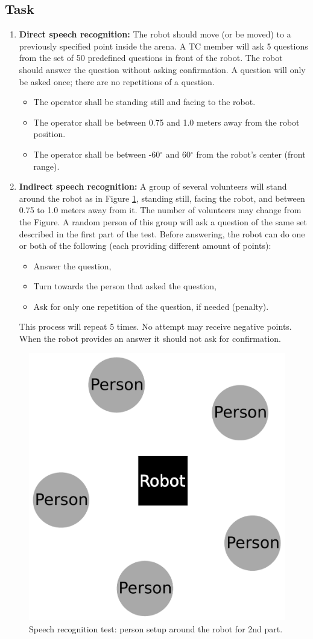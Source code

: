\subsection{Task}

\begin{enumerate}
\item \textbf{Direct speech recognition: } The robot should move (or be moved) to a previously specified point inside the arena. 
  A TC member will ask 5 questions from the set of 50 predefined questions in front of the robot. 
  The robot should answer the question without asking confirmation.
  A question will only be asked once; there are no repetitions of a question. 
\begin{itemize}
\item The operator shall be standing still and facing to the robot.
\item The operator shall be between 0.75 and 1.0 meters away from the robot position.
\item The operator shall be between -60$^{\circ}$ and 60$^{\circ}$ from the robot's center (front range).
\end{itemize}
\item \textbf{Indirect speech recognition: } A group of several volunteers will stand around the robot as in Figure \ref{fig:asrsetup}, standing still, facing the robot, and between 0.75 to 1.0 meters away from it. The number of volunteers may change from the Figure. A random person of this group will ask a question of the same set described in the first part of the test. Before answering, the robot can do one or both of the following (each providing different amount of points):
\begin{itemize}
\item Answer the question,
\item Turn towards the person that asked the question,
\item Ask for only one repetition of the question, if needed (penalty).
\end{itemize}
This process will repeat 5 times. No attempt may receive negative points. When the robot provides an answer it should not ask for confirmation.
\end{enumerate}

\begin{figure}[!h]
	\centering
	\includegraphics[width=0.5\columnwidth]{images/asrsetup.pdf}
	\caption{Speech recognition test: person setup around the robot for 2nd part.}
	\label{fig:asrsetup}
\end{figure}



